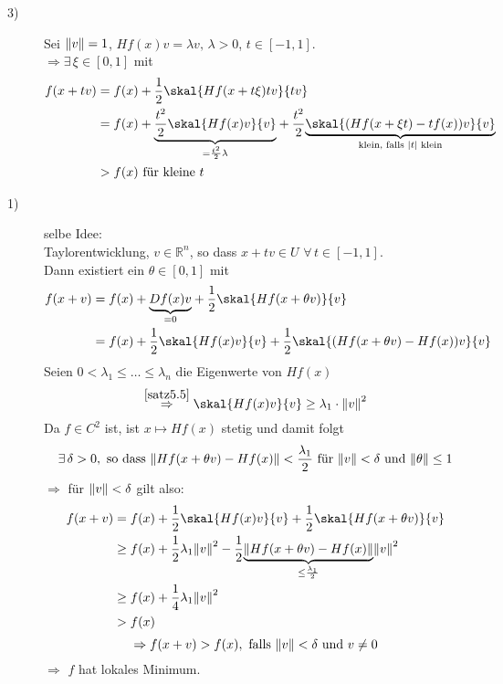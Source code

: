 \begin{description}
	\item[3)] Sei $\norm{v}=1$, $Hf(x)v=\lambda v, \, \lambda >0$, $t \in [-1,1]$. \\ 
		$\Rightarrow \exists\,\xi \in [0,1]$ mit  
	\begin{align*}
		f(x+tv)&=f(x)+ \frac{1}{2} \skal{Hf(x+t \xi)tv}{tv} \\
		&= f(x) + \underset{= \frac{t^2}{2}\lambda}{\underbrace{\frac{t^2}{2} \skal{Hf(x)v}{v}}} 
		+ \frac{t^2}{2} \underset{\text{klein, falls $\abs{t}$ klein}}{\underbrace{\skal{(Hf(x+\xi t)- t f(x))v}{v}}} \\
		&> f(x) \text{ für kleine $t$}	
	\end{align*}
	\item[1)] selbe Idee: \\
	Taylorentwicklung, $v \in \mathbb{R}^n$, so dass $x+tv \in U \,\, \forall\, t \in [-1,1]$. \\
	Dann existiert ein $\theta \in [0,1]$ mit
	\begin{align*}
		f(x+v) &=f(x)+ \underset{=0}{\underbrace{Df(x)v}} + \frac{1}{2} \skal{Hf(x+\theta v)}{v} \\
		&= f(x)+ \frac{1}{2}\skal{Hf(x)v}{v}+ \frac{1}{2}\skal{(Hf(x+\theta v)-Hf(x))v}{v} 
	\end{align*}
Seien $0 < \lambda_1 \leq \dots \leq \lambda_n$ die Eigenwerte von $Hf(x)$
\[
	\stackrel{\ref{satz5.5}}{\Rightarrow} \skal{Hf(x)v}{v} \geq \lambda_1 \cdot \norm{v}^2
\]
Da $f \in C^2$ ist, ist $x \mapsto Hf(x)$ stetig und damit folgt
\[
	\exists\,\delta >0, \text{ so dass } \norm{Hf(x+ \theta v)-Hf(x)} < \frac{\lambda_1}{2} \text{ für } \norm{v}<\delta \text{ und } \norm{\theta}\leq 1
\] 
$\Rightarrow $ für $\norm{v}< \delta $ gilt also:
\begin{align*}
	f(x+v)&= f(x)+ \frac{1}{2} \skal{Hf(x)v}{v}+ \frac{1}{2} \skal{Hf(x+ \theta v)}{v} \\
	&\geq f(x)+ \frac{1}{2} \lambda_1 \norm{v}^2 - \frac{1}{2} \underset{\leq \frac{\lambda_1}{2}}{\underbrace{\norm{Hf(x+ \theta v)-Hf(x)}}} \norm{v}^2 \\
	&\geq f(x)+ \frac{1}{4} \lambda_1 \norm{v}^2 \\
	&> f(x)
\end{align*}
\[
	\Rightarrow f(x+v)>f(x), \text{ falls } \norm{v} < \delta \text{ und } v \neq 0
\]
$\Rightarrow $ $f$ hat lokales Minimum. \bewende
\end{description}
